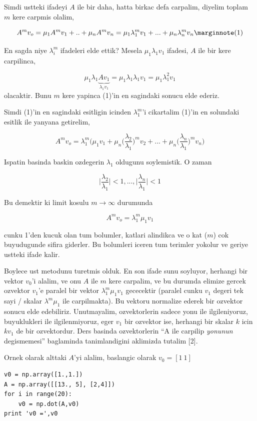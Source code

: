 \documentclass[12pt,fleqn]{article}\usepackage{../common}
\begin{document}
Simdi ustteki ifadeyi $A$ ile bir daha, hatta birkac defa carpalim, diyelim
toplam $m$ kere carpmis olalim,


$$ A^m v_o = \mu_1 A^m v_1 + .. + \mu_n A^m v_n =
\mu_1\lambda_1^mv_1 + ... + \mu_n\lambda_n^mv_n
\mlabel{1}
$$

En sagda niye $\lambda_i^m$ ifadeleri elde ettik? Mesela $\mu_1\lambda_1v_1$ ifadesi, $A$ ile bir kere carpilinca,

$$ \mu_1\lambda_1\underbrace{Av_1}_{\lambda_1v_1} =
\mu_1\lambda_1\lambda_1v_1 = 
\mu_1\lambda_1^2v_1 
  $$
olacaktir. Bunu $m$ kere yapinca (1)'in en sagindaki sonucu elde ederiz. 

Simdi (1)'in en sagindaki esitligin icinden $\lambda_1^m$'i cikartalim
(1)'in en solundaki esitlik ile yanyana getirelim,

$$ A^m v_o = 
\lambda_1^m \bigg(  
\mu_1v_1 
+ \mu_n \bigg(\frac{\lambda_2}{\lambda_1}\bigg)^m v_2
+ ... 
+ \mu_n \bigg(\frac{\lambda_n}{\lambda_1}\bigg)^m v_n
\bigg)
$$

Ispatin basinda baskin ozdegerin $\lambda_1$ oldugunu soylemistik. O zaman 

$$ 
\bigg| \frac{\lambda_2}{\lambda_1} \bigg| < 1, ..., 
\bigg| \frac{\lambda_n}{\lambda_1} \bigg| < 1
 $$

Bu demektir ki limit kosulu $m \to \infty$ durumunda

$$ A^m v_o = \lambda_1^m  \mu_1v_1 
$$

cunku 1'den kucuk olan tum bolumler, katlari alindikca ve o kat ($m$) cok
buyudugunde sifira giderler. Bu bolumleri iceren tum terimler yokolur ve
geriye ustteki ifade kalir. 

Boylece ust metodunu turetmis olduk. En son ifade sunu soyluyor, herhangi
bir vektor $v_0$'i alalim, ve onu $A$ ile $m$ kere carpalim, ve bu durumda
elimize gercek ozvektor $v_1$'e paralel bir vektor $\lambda_1^m \mu_1v_1$
gececektir (paralel cunku $v_1$ degeri tek sayi / skalar $\lambda^m\mu_1$
ile carpilmakta). Bu vektoru normalize ederek bir ozvektor sonucu elde
edebiliriz. Unutmayalim, ozvektorlerin sadece yonu ile ilgileniyoruz,
buyuklukleri ile ilgilenmiyoruz, eger $v_1$ bir ozvektor ise, herhangi bir
skalar $k$ icin $kv_1$ de bir ozvektordur. Ders basinda ozvektorlerin ``A
ile carpilip {\em yonunun} degismemesi'' baglaminda tanimlandigini
aklimizda tutalim [2].

Ornek olarak alttaki $A$'yi alalim, baslangic olarak $v_0 = [1 \ 1]$

\begin{verbatim}
v0 = np.array([1.,1.])
A = np.array([[13., 5], [2,4]])
for i in range(20): 
    v0 = np.dot(A,v0)
print 'v0 =',v0
\end{verbatim}
\end{document}

